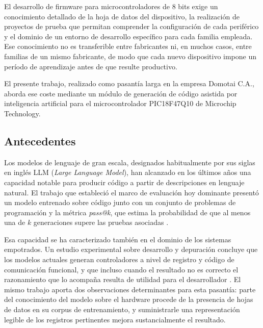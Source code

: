 %
%


El desarrollo de firmware para microcontroladores de 8 bits exige un
conocimiento detallado de la hoja de datos del dispositivo, la realización de
proyectos de prueba que permitan comprender la configuración de cada periférico
y el dominio de un entorno de desarrollo específico para cada familia empleada.
Ese conocimiento no es transferible entre fabricantes ni, en muchos casos, entre
familias de un mismo fabricante, de modo que cada nuevo dispositivo impone un
período de aprendizaje antes de que resulte productivo.

El presente trabajo, realizado como pasantía larga en la empresa Domotai C.A.,
aborda ese coste mediante un módulo de generación de código asistida por
inteligencia artificial para el microcontrolador PIC18F47Q10 de Microchip
Technology.

\subsection*{Antecedentes}

Los modelos de lenguaje de gran escala, designados habitualmente por sus siglas
en inglés LLM (\emph{Large Language Model}), han alcanzado en los últimos años
una capacidad notable para producir código a partir de descripciones en lenguaje
natural. El trabajo que estableció el marco de evaluación hoy dominante presentó
un modelo entrenado sobre código junto con un conjunto de problemas de
programación y la métrica \emph{pass@k}, que estima la probabilidad de que al
menos una de $k$ generaciones supere las pruebas asociadas
\cite{chen2021codex}.

Esa capacidad se ha caracterizado también en el dominio de los sistemas
empotrados. Un estudio experimental sobre desarrollo y depuración concluye que
los modelos actuales generan controladores a nivel de registro y código de
comunicación funcional, y que incluso cuando el resultado no es correcto el
razonamiento que lo acompaña resulta de utilidad para el desarrollador
\cite{englhardt2023embedded}. El mismo trabajo aporta dos observaciones
determinantes para esta pasantía: parte del conocimiento del modelo sobre el
hardware procede de la presencia de hojas de datos en su corpus de
entrenamiento, y suministrarle una representación legible de los registros
pertinentes mejora sustancialmente el resultado.

